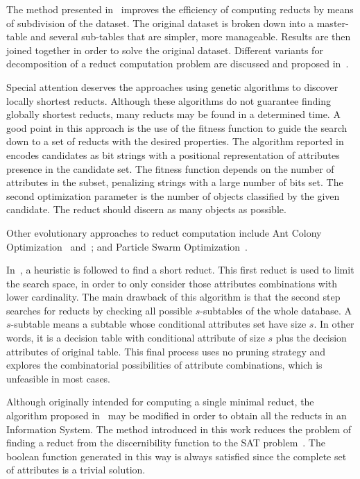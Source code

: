\documentclass[authoryear,11pt]{elsarticle}
\begin{document}
  The method presented in~\citep{Jiao10} improves the efficiency of computing reducts by means of subdivision 
  of the dataset. The original dataset is broken down into a master-table and several sub-tables that are simpler,
  more manageable. Results are then joined together in order to solve the original dataset. Different variants
  for decomposition of a reduct computation problem are discussed and proposed in~\citep{Strakowski08}.
  
  Special attention deserves the approaches using genetic algorithms to discover locally shortest reducts. Although 
  these algorithms do not guarantee finding globally shortest reducts, many reducts may be found in a determined
  time. A good point in this approach is the use of the fitness function to guide the search down to a set of 
  reducts with the desired properties. The algorithm reported in~\citep{Wroblewski95} encodes candidates as bit 
  strings with a positional representation of attributes presence in the candidate set. The fitness function
  depends on the number of attributes in the subset, penalizing strings with a large number of bits set. The 
  second optimization parameter is the number of objects classified by the given candidate. The reduct should 
  discern as many objects as possible.
  
  Other evolutionary approaches to reduct computation include Ant Colony Optimization~\citep{Jensen03}
  and~\citep{Chen10}; and Particle Swarm Optimization~\citep{Wang07}.
    
  In~\citep{Lin04}, a heuristic is followed to find a short reduct. This first reduct is used to limit the search
  space, in order to only consider those attributes combinations with lower cardinality. 
  The main drawback of this algorithm is that the second step searches for reducts by checking all possible 
  $s$-subtables of the whole database. A $s$-subtable means a subtable whose conditional attributes set have 
  size $s$. In other words, it is a decision table with conditional attribute of size $s$ plus the decision
  attributes of original table. This final process uses no pruning strategy and explores the combinatorial
  possibilities of attribute combinations, which is unfeasible in most cases.
  
  Although originally intended for computing a single minimal reduct, the algorithm proposed in~\citep{Jensen14}
  may be modified in order to obtain all the reducts in an Information System. The method introduced in this work
  reduces the problem of finding a reduct from the discernibility function to the SAT problem~\citep{Davis62}. 
  The boolean function generated in this way is always satisfied since the complete set of attributes is a trivial
  solution.
  
\end{document}
